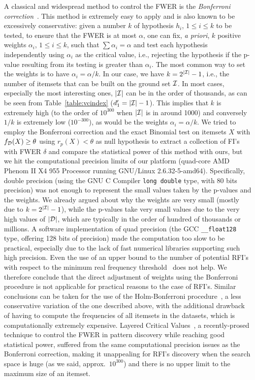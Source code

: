 A classical and widespread method to control the FWER is the \emph{Bonferroni
correction}~\cite{DudoitSB03}. This method is extremely easy to apply and
is also known to be excessively conservative: given a number $k$ of hypothesis
$h_i$, $1\le i\le k$ to be tested, to ensure that the FWER is at most $\alpha$,
one can fix, \emph{a priori}, $k$ positive weights $\alpha_i$, $1\le i\le k$,
such that $\sum \alpha_i=\alpha$ and test each hypothesis independently using
$\alpha_i$ as the critical value, i.e., rejecting the hypothesis if the p-value
resulting from its testing is greater than $\alpha_i$. The most common way to
set the weights is to have $\alpha_i=\alpha/k$. In our case, we have
$k=2^{|{\cal I}|}-1$, i.e., the number of itemsets that can be built on the ground
set ${\cal I}$. In most cases, especially the most
interesting ones, $|{\cal I}|$ can be in the order of thousands, as can be seen from
Table~\ref{table:vcindex} ($d'_1=|{\cal I}|-1$). This implies that $k$ is extremely
high (to the order of $10^{300}$ when $|{\cal I}|$ is in around 1000) and conversely
$1/k$ is extremely low ($10^{-300}$), as would be
the weights $\alpha_i=\alpha/k$. We tried to employ the Bonferroni correction and
the exact Binomial test on itemsets $X$ with $f_{\cal D}(X)\ge\theta$ using
$r_p(X)<\theta$ as null hypothesis to extract a collection of FI's with FWER
$\delta$ and compare the statistical power of this method with ours, but we hit
the computational precision limits of our platform (quad-core AMD Phenom\texttrademark
II X4 955 Processor running GNU/Linux 2.6.32-5-amd64). Specifically, double
precision (using the GNU C Compiler \texttt{long double} type, with 80 bits precision)
was not enough to represent the small values taken by the p-values and the
weights. We already argued about why the weights are very small (mostly due to
$k=2^{|{\cal I}|}-1$), while the p-values take very small values due to the very
high values of $|{\cal D}|$, which are typically in the order of hundred of thousands
or millions. A software implementation of quad precision (the GCC
\texttt{\_\_float128} type, offering 128 bits of precision) made the computation
too slow to be practical, especially due to the lack of fast numerical libraries
supporting such high precision. Even the use of an upper bound to the number of
potential RFI's with respect to the minimum real frequency
threshold~\citep[Lemma 4.1]{ChakaravarthyPS09} does not help. We therefore
conclude that the direct adjustment of weights using the Bonferroni procedure is
not applicable for practical reasons to the case of RFI's. Similar conclusions
can be taken for the use of the Holm-Bonferroni procedure~\citep{Holm79}, a less
conservative variation of the one described above, with the
additional drawback of having to compute the frequencies of all itemsets in the
datasets, which is computationally extremely expensive. Layered Critical
Values~\citep{Webb08}, a recently-prosed technique to control the FWER in
pattern discovery while reaching good statistical power, suffered from the same
computational precision issues as the Bonferroni correction, making it
unappealing for RFI's discovery when the search space is huge (as we said,
approx.~$10^{300}$) and there is no upper limit to the maximum size of an
itemset.

